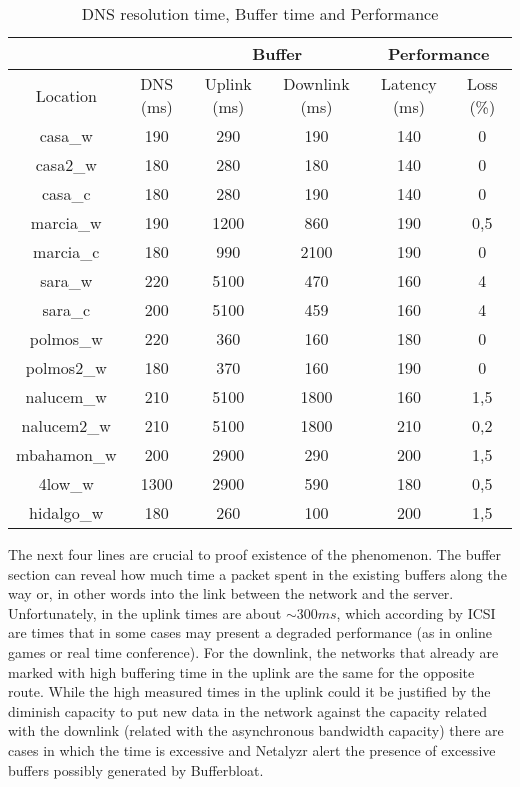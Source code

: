 \begin{table}[ht]
\begin{center}
\begin{tabular}{|c||c||c|c||c|c||}
 \hline
& & \multicolumn{2}{|c||}{Buffer} & \multicolumn{2}{|c||}{Performance} \\ \hline
Location	& DNS (ms) 	& Uplink (ms)	& Downlink (ms) & Latency (ms)	& Loss (\%) \\ \hline \hline
casa\_w		& 190		& 290			& 190 			& 140			& 0 		\\ \hline
casa2\_w	& 180		& 280			& 180 			& 140			& 0 		\\ \hline
casa\_c		& 180		& 280			& 190			& 140			& 0 		\\ \hline
marcia\_w	& 190		& 1200			& 860			& 190			& 0,5 		\\ \hline
marcia\_c	& 180		& 990			& 2100			& 190			& 0 		\\ \hline
sara\_w		& 220		& 5100			& 470			& 160			& 4 		\\ \hline
sara\_c		& 200		& 5100			& 459			& 160			& 4 		\\ \hline
polmos\_w	& 220		& 360			& 160			& 180			& 0 		\\ \hline
polmos2\_w	& 180		& 370			& 160			& 190			& 0 		\\ \hline
nalucem\_w	& 210		& 5100			& 1800			& 160			& 1,5 		\\ \hline
nalucem2\_w	& 210		& 5100			& 1800			& 210			& 0,2 		\\ \hline
mbahamon\_w	& 200		& 2900			& 290			& 200			& 1,5 		\\ \hline
4low\_w		& 1300		& 2900			& 590			& 180			& 0,5 		\\ \hline
hidalgo\_w	& 180		& 260			& 100			& 200			& 1,5  		\\ \hline
\end{tabular}
\caption[Netalyrz Test:DNS resolution time, Buffer time and Performance]{DNS resolution time, Buffer time and Performance}
\label{table:buffer}
\end{center}
\end{table}

The next four lines are crucial to proof existence of the phenomenon. The
buffer section can reveal how much time a packet spent in the existing buffers
along the way or, in other words into the link between the network and the
server. Unfortunately, in the uplink times are about $\sim300ms$, which
according by ICSI are times that in some cases may present a degraded
performance (as in online games or real time conference). For the downlink,
the networks that already are marked with high buffering time in the uplink
are the same for the opposite route. While the high measured times in the
uplink could it be justified by the diminish capacity to put new data in the
network against the capacity related with the downlink (related with the
asynchronous bandwidth capacity) there are cases in which the time is
excessive and Netalyzr alert the presence of excessive buffers possibly
generated by Bufferbloat.

